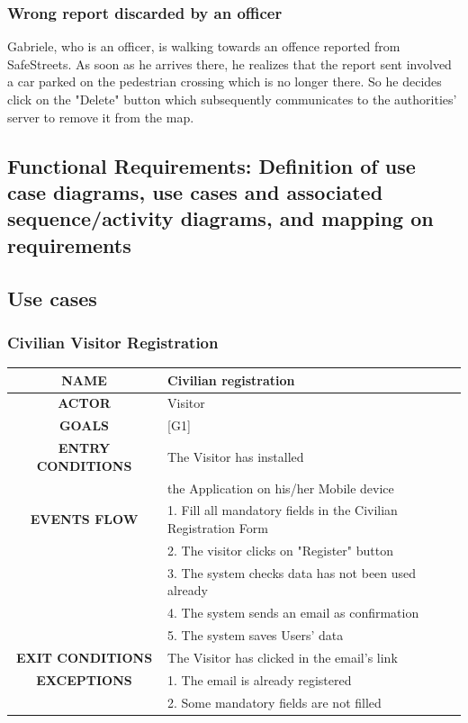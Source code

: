 \documentclass[12pt,a4paper]{article}
\begin{document}
\subsubsection{Wrong report discarded by an officer}
Gabriele, who is an officer, is walking towards an offence reported from SafeStreets. As soon as he arrives there, he realizes that the report sent involved a car parked on the pedestrian crossing which is no longer there. So he decides click on the "Delete" button which subsequently communicates to the authorities' server to remove it from the map.

\subsection{Functional	 Requirements:	 Definition	 of	 use	 case	 diagrams,	 use	 cases	 and	 associated	
sequence/activity	diagrams,	and	mapping	on	requirements} 
\subsection{Use cases}
\subsubsection{Civilian Visitor Registration}
		\begin{center}
			\begin{tabular}{| c | l |}
				\hline
				\textbf{NAME} & Civilian registration \\
				\hline
				\textbf{ACTOR} & Visitor \\
				\hline
				\textbf{GOALS} & [G1] \\
				\hline
				\textbf{ENTRY CONDITIONS} & The Visitor has installed \\
				&	the Application on his/her Mobile device \\ \hline
				\textbf{EVENTS FLOW}  &
				1. Fill all mandatory fields in the Civilian Registration Form\\
				&2. The visitor clicks on "Register" button\\
				&3. The system checks data has not been used already\\
				&4. The system sends an email as confirmation\\
				&5. The system saves Users' data\\
				\hline
				\textbf{EXIT CONDITIONS}  & The Visitor has clicked in the email's link\\ \hline
				\textbf{EXCEPTIONS} &
				1. The email is already registered\\
				&2.  Some mandatory fields are not filled\\
				\hline
			\end{tabular}
		\end{center}
\newpage
\end{document}
